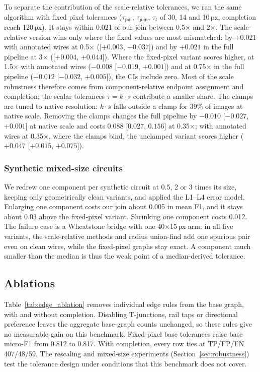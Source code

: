 \documentclass[journal]{IEEEtran}
\begin{document}
To separate the contribution of the scale-relative tolerances, we ran the same algorithm with fixed pixel tolerances ($\tau_{\text{pin}}$, $\tau_{\text{join}}$, $\tau_t$ of 30, 14 and 10\,px, completion reach 120\,px). It stays within 0.021 of our join between 0.5$\times$ and 2$\times$. The scale-relative version wins only where the fixed values are most mismatched: by $+0.021$ with annotated wires at 0.5$\times$ ([$+0.003$, $+0.037$]) and by $+0.021$ in the full pipeline at 3$\times$ ([$+0.004$, $+0.044$]). Where the fixed-pixel variant scores higher, at 1.5$\times$ with annotated wires ($-0.008$ [$-0.019$, $+0.001$]) and at 0.75$\times$ in the full pipeline ($-0.012$ [$-0.032$, $+0.005$]), the CIs include zero. Most of the scale robustness therefore comes from component-relative endpoint assignment and completion; the scalar tolerances $\tau=k\cdot s$ contribute a smaller share. The clamps are tuned to native resolution: $k\cdot s$ falls outside a clamp for 39\% of images at native scale. Removing the clamps changes the full pipeline by $-0.010$ [$-0.027$, $+0.001$] at native scale and costs $0.088$ [$0.027$, $0.156$] at 0.35$\times$; with annotated wires at 0.35$\times$, where the clamps bind, the unclamped variant scores higher ($+0.047$ [$+0.015$, $+0.075$]).

\subsubsection{Synthetic mixed-size circuits}
We redrew one component per synthetic circuit at 0.5, 2 or 3 times its size, keeping only geometrically clean variants, and applied the L1--L4 error model. Enlarging one component costs our join about 0.005 in mean F1, and it stays about 0.03 above the fixed-pixel variant. Shrinking one component costs 0.012. The failure case is a Wheatstone bridge with one 40$\times$15\,px arm: in all five variants, the scale-relative methods and radius union-find add one spurious pair even on clean wires, while the fixed-pixel graphs stay exact. A component much smaller than the median is thus the weak point of a median-derived tolerance.

\subsection{Ablations}
\label{sec:mech_ablation}

Table~\ref{tab:edge_ablation} removes individual edge rules from the base graph, with and without completion. Disabling T-junctions, rail taps or directional preference leaves the aggregate base-graph counts unchanged, so these rules give no measurable gain on this benchmark. Fixed-pixel base tolerances raise base micro-F1 from 0.812 to 0.817. With completion, every row ties at TP/FP/FN 407/48/59. The rescaling and mixed-size experiments (Section~\ref{sec:robustness}) test the tolerance design under conditions that this benchmark does not cover.
\end{document}
